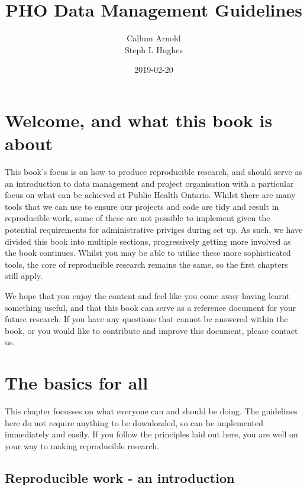 \documentclass[]{book}
\title{PHO Data Management Guidelines}
\author{Callum Arnold \\ Steph L Hughes}
\date{2019-02-20}
\begin{document}
\maketitle

{
\setcounter{tocdepth}{1}
\tableofcontents
}
\hypertarget{welcome-and-what-this-book-is-about}{%
\chapter*{Welcome, and what this book is about}\label{welcome-and-what-this-book-is-about}}

This book's focus is on how to produce reproducible research, and should serve as an introduction to data management and project organisation with a particular focus on what can be achieved at Public Health Ontario. Whilst there are many tools that we can use to ensure our projects and code are tidy and result in reproducible work, some of these are not possible to implement given the potential requirements for administrative priviges during set up. As such, we have divided this book into multiple sections, progressively getting more involved as the book continues. Whilst you may be able to utilise these more sophisticated tools, the core of reproducible research remains the same, so the first chapters still apply.

We hope that you enjoy the content and feel like you come away having learnt something useful, and that this book can serve as a reference document for your future research. If you have any questions that cannot be answered within the book, or you would like to contribute and improve this document, please contact us.

\hypertarget{the-basics-for-all}{%
\chapter{The basics for all}\label{the-basics-for-all}}

This chapter focusses on what everyone can and should be doing. The guidelines here do not require anything to be downloaded, so can be implemented immediately and easily. If you follow the principles laid out here, you are well on your way to making reproducible research.

\hypertarget{reproducible-work---an-introduction}{%
\section{Reproducible work - an introduction}\label{reproducible-work---an-introduction}}
\end{document}
